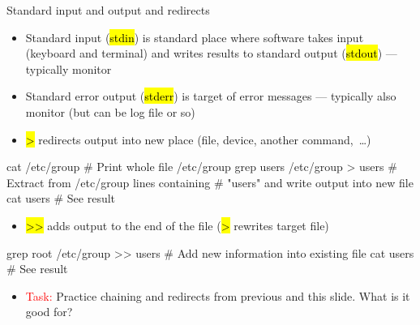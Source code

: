 \documentclass[compress, ucs, xelatex, 11pt, xcolor=svgnames, aspectratio=169,
	hyperref={
		bookmarks=true,
		unicode=true,
		colorlinks=true,
		pdftitle={Linux, command line and MetaCentrum},
		plainpages=false,
		pdfauthor={Vojtech Zeisek},
		pdfsubject={Course about use of Linux command line, writing shell scripts and using MetaCentrum of CESNET},
		pdfcreator={XeLaTeX},
		pdfkeywords={Linux, GNU, BASH, shell, command line, MetaCentrum},
		linkcolor=DarkRed, %
		anchorcolor=DarkBlue, %
		citecolor=Indigo, %
		filecolor=NavyBlue, %
		menucolor=DarkMagenta, %
		urlcolor=DarkBlue, %
		pdftex},
	url={hyphens, lowtilde} %
	]{beamer}
\renewcommand{\texttt}[1]{\hl{\ttfamily #1}}
\renewcommand{\alert}[1]{\textcolor{red}{#1}}
\begin{document}
\begin{frame}[fragile]{Standard input and output and redirects}
	\begin{itemize}
		\item Standard input (\texttt{stdin}) is standard place where software takes input (keyboard and terminal) and writes results to standard output (\texttt{stdout}) --- typically monitor
		\item Standard error output (\texttt{stderr}) is target of error messages --- typically also monitor (but can be log file or so)
		\item \alert{\texttt{\textgreater}} redirects output into new place (file, device, another command,~\ldots)
	\end{itemize}
	\vfill
	\begin{bashcode}
    cat /etc/group # Print whole file /etc/group
    grep users /etc/group > users # Extract from /etc/group lines containing
                                  # "users" and write output into new file
    cat users # See result
	\end{bashcode}
	\vfill
	\begin{itemize}
		\item \alert{\texttt{\textgreater\textgreater}} adds output to the end of the file (\texttt{\textgreater} rewrites target file)
	\end{itemize}
	\vfill
	\begin{bashcode}
    grep root /etc/group >> users # Add new information into existing file
    cat users # See result
	\end{bashcode}
	\vfill
	\begin{itemize}
		\item \alert{Task:} Practice chaining and redirects from previous and this slide. What is it good for?
	\end{itemize}
\end{frame}
\end{document}
